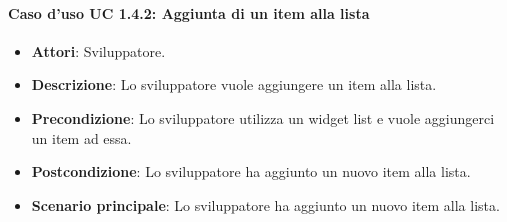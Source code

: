 \paragraph{Caso d'uso UC 1.4.2: Aggiunta di un item alla lista}
\label{UC 1.4.2: Aggiunta di un item alla lista}

\FloatBarrier
\begin{itemize}
\item\textbf{Attori}: Sviluppatore.
\item\textbf{Descrizione}: Lo sviluppatore vuole aggiungere un item alla lista.
\item\textbf{Precondizione}: Lo sviluppatore utilizza un widget list e vuole aggiungerci un item ad essa.
\item\textbf{Postcondizione}: Lo sviluppatore ha aggiunto un nuovo item alla lista.
\item\textbf{Scenario principale}: Lo sviluppatore ha aggiunto un nuovo item alla lista.
\end{itemize}
